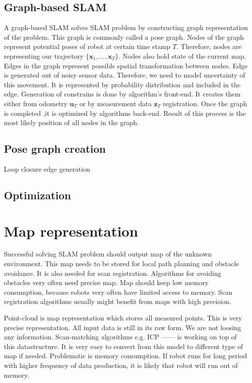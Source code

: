 \subsection{Graph-based SLAM}
A graph-based SLAM solves SLAM problem by constructing graph representation of the problem. This graph is commonly called a pose graph. Nodes of the graph represent potential poses of robot at certain time stamp $ T $. Therefore, nodes are representing our trajectory $ \{\textbf{x}_{1},...,\textbf{x}_{T}\} $. Nodes also hold state of the current map. Edges in the graph represent possible spatial transformation between nodes. Edge is generated out of noisy sensor data. Therefore, we need to model uncertainty of this movement. It is represented by probability distribution and included in the edge. Generation of constrains is done by algorithm's front-end. It creates them either from odometry $  \textbf{u}_{T} $ or by measurement data  $ \textbf{z}_{T} $ registration. Once the graph is completed ,it is optimized by algorithms back-end. Result of this process is the most likely position of all nodes in the graph.

\subsection {Pose graph creation}
\label{Pose_graph_creation}
Loop closure edge generation 
\newpage

\newpage
\subsection{Optimization}
\newpage



\section{Map representation}
\label{MAP_REPRE}
Successful solving SLAM problem should output map of the unknown environment. This map needs to be stored for local path planning and obstacle avoidance. It is also needed for scan registration. Algorithms for avoiding obstacles very often need precise map. Map should keep low memory consumption, because robots very often have limited access to memory. Scan registration algorithms usually might benefit from maps with high precision.

Point-cloud is map representation which stores all measured points. This is very precise representation. All input data is still in its raw form. We are not loosing any information. Scan-matching algorithms e.g. ICP   ------ is working on top of this datastructure. It is very easy to convert from this model to different type of map if needed. Problematic is memory consumption. If robot runs for long period with higher frequency of data production, it is likely that robot will run out of memory.

